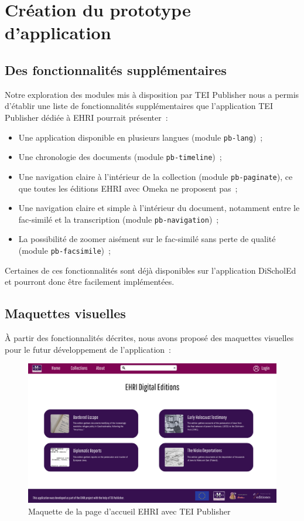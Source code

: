 \section{Création du prototype d'application}

\subsection{Des fonctionnalités supplémentaires}
Notre exploration des modules mis à disposition par TEI Publisher nous a permis d'établir une liste de fonctionnalités supplémentaires que l'application TEI Publisher dédiée à EHRI pourrait présenter~: 

\begin{itemize}
    \item Une application disponible en plusieurs langues (module \texttt{pb-lang})~;
    \item Une chronologie des documents (module \texttt{pb-timeline})~;
    \item Une navigation claire à l'intérieur de la collection (module \texttt{pb-paginate}), ce que toutes les éditions EHRI avec Omeka ne proposent pas~;
    \item Une navigation claire et simple à l'intérieur du document, notamment entre le fac-similé et la transcription (module \texttt{pb-navigation})~;
    \item La possibilité de zoomer aisément sur le fac-similé sans perte de qualité (module \texttt{pb-facsimile})~;
\end{itemize}

Certaines de ces fonctionnalités sont déjà disponibles sur l'application DiScholEd et pourront donc être facilement implémentées.


\subsection{Maquettes visuelles}
À partir des fonctionnalités décrites, nous avons proposé des maquettes visuelles pour le futur développement de l'application~: 

\begin{figure}[h]
    \centering
    \includegraphics[width=0.55\linewidth]{2-MAIN/images/ehri-accueil.png}
    \caption{Maquette de la page d'accueil EHRI avec TEI Publisher}
    \label{fig:ehri-accueilmaquette}
\end{figure}

